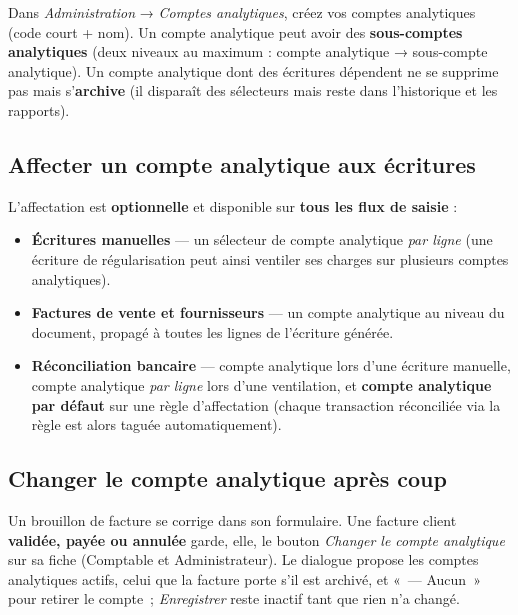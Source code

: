 \documentclass[a4paper,11pt,oneside]{article}
\begin{document}
Dans \emph{Administration} → \emph{Comptes analytiques}, créez vos comptes analytiques (code
court + nom). Un compte analytique peut avoir des \textbf{sous-comptes analytiques} (deux
niveaux au maximum : compte analytique → sous-compte analytique). Un compte analytique dont des
écritures dépendent ne se supprime pas mais s'\textbf{archive} (il disparaît des sélecteurs
mais reste dans l'historique et les rapports).

\subsection{Affecter un compte analytique aux écritures}

L'affectation est \textbf{optionnelle} et disponible sur \textbf{tous les flux de saisie} :
\begin{itemize}
    \item \textbf{Écritures manuelles} — un sélecteur de compte analytique \emph{par ligne}
          (une écriture de régularisation peut ainsi ventiler ses charges sur plusieurs
          comptes analytiques).
    \item \textbf{Factures de vente et fournisseurs} — un compte analytique au niveau du
          document, propagé à toutes les lignes de l'écriture générée.
    \item \textbf{Réconciliation bancaire} — compte analytique lors d'une écriture manuelle,
          compte analytique \emph{par ligne} lors d'une ventilation, et \textbf{compte
          analytique par défaut} sur une règle d'affectation (chaque transaction réconciliée
          via la règle est alors taguée automatiquement).
\end{itemize}

\subsection{Changer le compte analytique après coup}
\label{sec:reimputation-analytique}

Un brouillon de facture se corrige dans son formulaire. Une facture client \textbf{validée,
payée ou annulée} garde, elle, le bouton \emph{Changer le compte analytique} sur sa fiche
(Comptable et Administrateur). Le dialogue propose les comptes analytiques actifs, celui que la
facture porte s'il est archivé, et «~— Aucun~» pour retirer le compte~; \emph{Enregistrer} reste
inactif tant que rien n'a changé.
\end{document}
